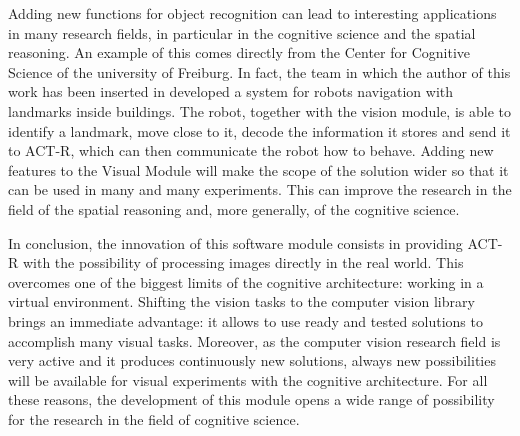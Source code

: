 	Adding new functions for object recognition can lead to interesting applications in many research fields, in particular in the cognitive science and the spatial reasoning. 
	An example of this comes directly from the Center for Cognitive Science of the university of Freiburg.
	In fact, the team in which the author of this work has been inserted in developed a system for robots navigation with landmarks inside buildings. 
	The robot, together with the vision module, is able to identify a landmark, move close to it, decode the information it stores and send it to \mbox{ACT-R}, which can then communicate the robot how to behave.
	Adding new features to the Visual Module will make the scope of the solution wider so that it can be used in many and many experiments.
	This can improve the research in the field of the spatial reasoning and, more generally, of the cognitive science.


	In conclusion, the innovation of this software module consists in providing \mbox{ACT-R} with the possibility of processing images directly in the real world.
	This overcomes one of the biggest limits of the cognitive architecture: working in a virtual environment.
	Shifting the vision tasks to the computer vision library brings an immediate advantage: it allows to use ready and tested solutions to accomplish many visual tasks.
	Moreover, as the computer vision research field is very active and it produces continuously new solutions, always new possibilities will be available for visual experiments with the cognitive architecture.
	For all these reasons, the development of this module opens a wide range of possibility for the research in the field of cognitive science.




